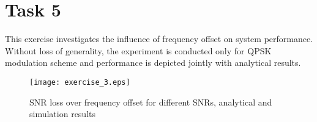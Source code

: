 \documentclass[a4paper,10pt]{paper}
\begin{document}
\newpage
\section{Task 5}
This exercise investigates the influence of frequency offset on system performance. Without loss of generality, the experiment is conducted only for QPSK modulation scheme and performance is depicted jointly with analytical results. 
\begin{figure}[thb]
\centering
\texttt{[image: exercise\_3.eps]}
\caption{SNR loss over frequency offset for different SNRs, analytical and simulation results}
\end{figure}
\end{document}
